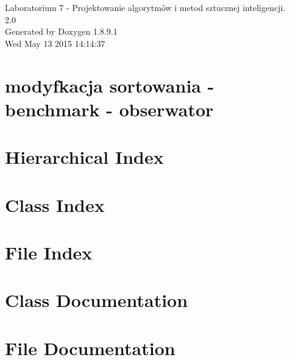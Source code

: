 \documentclass[twoside]{article}
\newcommand{\+}{\discretionary{\mbox{\scriptsize$\hookleftarrow$}}{}{}}
\begin{document}
\hypersetup{pageanchor=false,
             bookmarks=true,
             bookmarksnumbered=true,
             pdfencoding=unicode
            }
\begin{titlepage}
\vspace*{7cm}
\begin{center}%
{\Large Laboratorium 7 -\/ Projektowanie algorytmów i metod sztucznej inteligencji. \\[1ex]\large 2.\+0 }\\
\vspace*{1cm}
{\large Generated by Doxygen 1.8.9.1}\\
\vspace*{0.5cm}
{\small Wed May 13 2015 14:14:37}\\
\end{center}
\end{titlepage}
\tableofcontents
{}
\hypersetup{pageanchor=true}

\section{modyfkacja sortowania -\/ benchmark -\/ obserwator}
\label{index}\hypertarget{index}{}
\section{Hierarchical Index}

\section{Class Index}

\section{File Index}

\section{Class Documentation}






\section{File Documentation}












\end{document}
